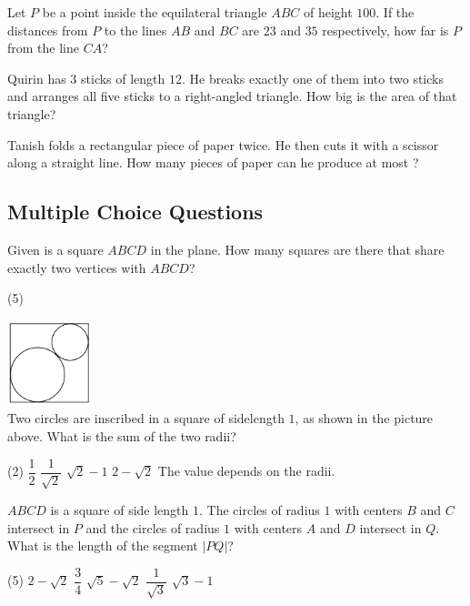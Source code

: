 \documentclass{article}
\begin{document}
\begin{problem}
Let $P$ be a point inside the equilateral triangle $ABC$ of height $100$. If the distances from $P$ to the lines $AB$ and $BC$ are $23$ and $35$ respectively, how far is $P$ from the line $CA$?
\end{problem}

\begin{problem}
Quirin has $3$ sticks of length $12$. He breaks exactly one of them into two sticks and arranges all five sticks to a right-angled triangle. How big is the area of that triangle?
\end{problem}

\begin{problem}
Tanish folds a rectangular piece of paper twice. He then cuts it with a scissor along a straight line. How many pieces of paper can he produce at most ?
\end{problem}


\subsection{Multiple Choice Questions}
\begin{problem}
Given is a square $ABCD$ in the plane. How many squares are there that share exactly two vertices with $ABCD$?
\end{problem}
\begin{tasks}(5)
\end{tasks}

\begin{problem}
\includegraphics[width=70pt]{img3} \\
Two circles are inscribed in a square of sidelength $1$, as shown in the picture above. What is the sum of the two radii?
\end{problem}
\begin{tasks}(2)
\task $\dfrac{1}{2}$
\task $\dfrac{1}{\sqrt{2}}$
\task $\sqrt{2} - 1$
\task $2 - \sqrt{2}$
\task The value depends on the radii.
\end{tasks}

\begin{problem}
$ABCD$ is a square of side length $1$. The circles of radius $1$ with centers $B$ and $C$ intersect in $P$ and the circles of radius $1$ with centers $A$ and $D$ intersect in $Q$. What is the length of the segment $|PQ|$?
\end{problem}
\begin{tasks}(5)
\task $2- \sqrt{2}$
\task $\dfrac{3}{4}$
\task $\sqrt{5} - \sqrt{2}$
\task $\dfrac{1}{\sqrt{3}}$
\task $\sqrt{3} - 1$
\end{tasks}
\end{document}
